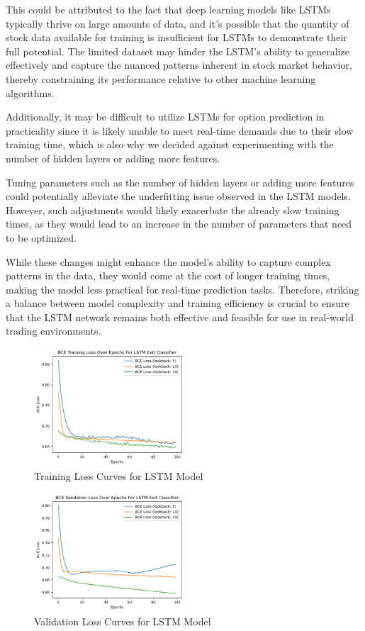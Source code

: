 \documentclass[11pt]{article}
\begin{document}
This could be attributed to the fact that deep learning models like LSTMs typically thrive on large amounts of data, and it's possible that the quantity of stock data available for training is insufficient for LSTMs to demonstrate their full potential. The limited dataset may hinder the LSTM's ability to generalize effectively and capture the nuanced patterns inherent in stock market behavior, thereby constraining its performance relative to other machine learning algorithms.

Additionally, it may be difficult to utilize LSTMs for option prediction in practicality since it is likely unable to meet real-time demands due to their slow training time, which is also why we decided against experimenting with the number of hidden layers or adding more features. 

Tuning parameters such as the number of hidden layers or adding more features could potentially alleviate the underfitting issue observed in the LSTM models. However, such adjustments would likely exacerbate the already slow training times, as they would lead to an increase in the number of parameters that need to be optimized.

While these changes might enhance the model's ability to capture complex patterns in the data, they would come at the cost of longer training times, making the model less practical for real-time prediction tasks. Therefore, striking a balance between model complexity and training efficiency is crucial to ensure that the LSTM network remains both effective and feasible for use in real-world trading environments.
\begin{figure}[H]
    \centering
    \includegraphics[width=0.5\textwidth]{training_loss.png} 
    \caption{Training Loss Curves for LSTM Model}
    \label{fig:example}
\end{figure}

\begin{figure}[H]
    \centering
    \includegraphics[width=0.5\textwidth]{validation_loss.png} 
    \caption{Validation Loss Curves for LSTM Model}
    \label{fig:example}
\end{figure}
\end{document}
